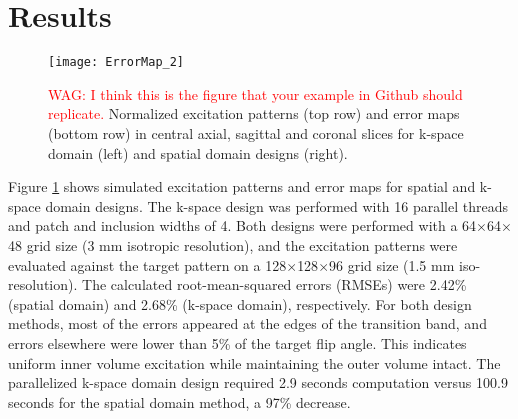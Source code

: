 \section*{Results}

\begin{figure}
	\centering
	\texttt{[image: ErrorMap\_2]}
	\caption{\textcolor{red}{WAG: I think this is the figure that your example in Github should replicate.}
	Normalized excitation patterns (top row) and error maps (bottom row) in central axial, sagittal and coronal slices 
	for k-space domain (left) and spatial domain designs (right).}
	\label{fig:ErrorMap}
\end{figure}
Figure \ref{fig:ErrorMap} shows simulated excitation patterns and error maps for spatial and k-space domain designs. 
The k-space design was performed with 16 parallel threads and patch and inclusion widths of 4. 
Both designs were performed with a 64$\times$64$\times$48 grid size (3 mm isotropic resolution), 
and the excitation patterns were evaluated against the target pattern on a 128$\times$128$\times$96 grid size (1.5 mm iso-resolution). 
The calculated root-mean-squared errors (RMSEs) were 2.42\% (spatial domain) and 2.68\% (k-space domain), 
respectively. 
For both design methods, most of the errors appeared at the edges of the transition band, and errors elsewhere were lower than 5\% of the target flip angle. 
This indicates uniform inner volume excitation while maintaining the outer volume intact. 
The parallelized k-space domain design required 2.9 seconds computation versus 100.9 seconds for the spatial domain method, a 97\% decrease.


